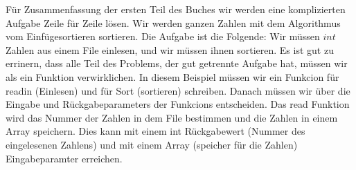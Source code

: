 \documentclass{article}[12pt]
\newenvironment{myexampleprogram}[1]{%
    \tcolorbox[beamer,%
    noparskip,breakable,
    colback=White,colframe=Goldenrod,%
    colbacklower=Yellow!75!White,%
    title=#1]}%
    {\endtcolorbox}
\begin{document}
\begin{myexampleprogram}{ Programme: \texttt{Einfügesortieren}}
Für Zusammenfassung der ersten Teil des Buches wir werden eine komplizierten Aufgabe Zeile für Zeile lösen.
Wir werden ganzen Zahlen mit dem Algorithmus vom Einfügesortieren sortieren. Die Aufgabe ist die Folgende:
Wir müssen $int$ Zahlen aus einem File einlesen, und wir müssen ihnen sortieren. Es ist gut zu errinern, 
dass alle Teil des Problems, der gut getrennte Aufgabe hat, müssen wir als ein Funktion verwirklichen.
In diesem Beispiel müssen wir ein Funkcion für readin (Einlesen) und für Sort (sortieren) schreiben.
Danach müssen wir über die Eingabe und Rückgabeparameters der Funkcions entscheiden.
Das read Funktion wird das Nummer der Zahlen in dem File bestimmen und die Zahlen in einem Array
speichern. Dies kann mit einem int Rückgabewert (Nummer des eingelesenen Zahlens) und mit einem Array
(speicher für die Zahlen) Eingabeparamter erreichen.


\end{myexampleprogram}
\end{document}
